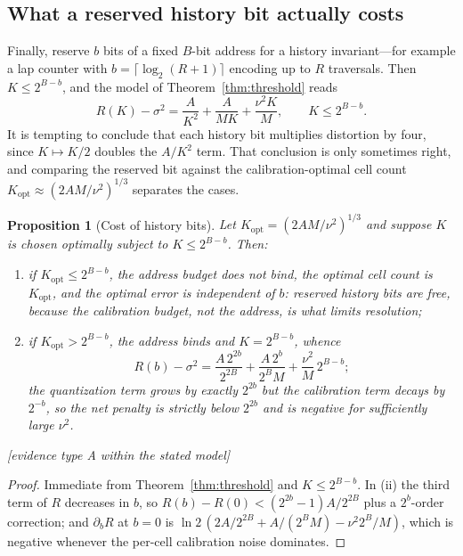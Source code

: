 \documentclass[11pt]{article}
\newtheorem{proposition}[theorem]{Proposition}
\begin{document}
\subsection{What a reserved history bit actually costs}

Finally, reserve $b$ bits of a fixed $B$-bit address for a history invariant---for example
a lap counter with $b=\lceil\log_2(R+1)\rceil$ encoding up to $R$ traversals. Then
$K\le 2^{B-b}$, and the model of Theorem~\ref{thm:threshold} reads
\begin{equation}
R(K)-\sigma^{2}=\frac{A}{K^{2}}+\frac{A}{MK}+\frac{\nu^{2}K}{M},
\qquad K\le 2^{B-b}.
\end{equation}
It is tempting to conclude that each history bit multiplies distortion by four, since
$K\mapsto K/2$ doubles the $A/K^2$ term. That conclusion is only sometimes right, and
comparing the reserved bit against the calibration-optimal cell count
$K_{\mathrm{opt}}\approx(2AM/\nu^{2})^{1/3}$ separates the cases.

\begin{proposition}[Cost of history bits]\label{prop:historybits}
Let $K_{\mathrm{opt}}=(2AM/\nu^{2})^{1/3}$ and suppose $K$ is chosen optimally subject to
$K\le 2^{B-b}$. Then:
\begin{enumerate}[label=(\roman*)]
\item if $K_{\mathrm{opt}}\le 2^{B-b}$, the address budget does not bind, the optimal cell
  count is $K_{\mathrm{opt}}$, and the optimal error is \emph{independent of $b$}: reserved
  history bits are free, because the calibration budget, not the address, is what limits
  resolution;
\item if $K_{\mathrm{opt}}>2^{B-b}$, the address binds and $K=2^{B-b}$, whence
  \begin{equation}
  R(b)-\sigma^{2}=\frac{A\,2^{2b}}{2^{2B}}+\frac{A\,2^{b}}{2^{B}M}+\frac{\nu^{2}}{M}\,2^{B-b};
  \end{equation}
  the quantization term grows by exactly $2^{2b}$ but the calibration term \emph{decays} by
  $2^{-b}$, so the net penalty is strictly below $2^{2b}$ and is negative for sufficiently
  large $\nu^{2}$.
\end{enumerate}
[evidence type A within the stated model]
\end{proposition}
\begin{proof}
Immediate from Theorem~\ref{thm:threshold} and $K\le2^{B-b}$. In (ii) the third term of
$R$ decreases in $b$, so
$R(b)-R(0)<(2^{2b}-1)A/2^{2B}$ plus a $2^{b}$-order correction; and
$\partial_b R$ at $b=0$ is $\ln2\,(2A/2^{2B}+A/(2^{B}M)-\nu^{2}2^{B}/M)$, which is negative
whenever the per-cell calibration noise dominates.
\end{proof}
\end{document}
